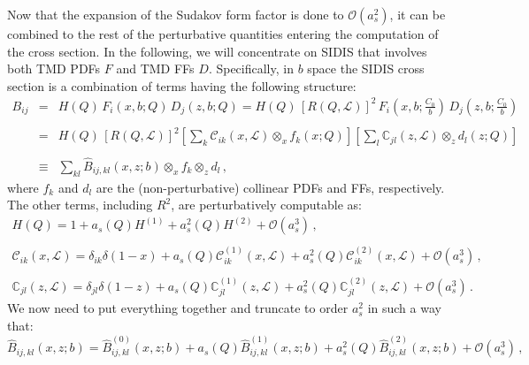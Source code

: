 \documentclass[10pt,a4paper]{article}
\begin{document}
Now that the expansion of the Sudakov form factor is done to
$\mathcal{O}(a_s^2)$, it can be combined to the rest of the
perturbative quantities entering the computation of the cross
section. In the following, we will concentrate on SIDIS that involves
both TMD PDFs $F$ and TMD FFs $D$. Specifically, in $b$ space the
SIDIS cross section is a combination of terms having the following
structure:
\begin{equation}
\begin{array}{rcl}
  \displaystyle B_{ij} &=& \displaystyle
                           H(Q)\,F_i(x,b;Q)\,D_j(z,b;Q)
                           =H(Q)\,\left[R(Q,\mathcal{L})\right]^2
                           \,F_i\left(x,b;\frac{C_0}{b}\right)\,D_j\left(z,b;\frac{C_0}{b}\right)\\
\\
&=& \displaystyle H(Q)\,\left[R(Q,\mathcal{L})\right]^2
                           \left[\sum_{k}
    \mathcal{C}_{ik}(x,\mathcal{L}) \mathop{\otimes}_x
    f_k\left(x;Q\right)\right]\left[\sum_{l}
    \mathbb{C}_{jl}(z,\mathcal{L}) \mathop{\otimes}_z
    d_l\left(z;Q\right)\right]\\
\\
&\equiv& \displaystyle \sum_{kl}\hat{B}_{ij,kl}(x,z;b)\mathop{\otimes}_{x}f_k \mathop{\otimes}_{z}d_l \,,
\end{array}
\end{equation}
where $f_k$ and $d_l$ are the (non-perturbative) collinear PDFs and FFs,
respectively. The other terms, including $R^2$, are perturbatively
computable as:
\begin{equation}
\begin{array}{l}
\displaystyle H(Q) = 1+a_s(Q)H^{(1)}+a_s^2(Q)H^{(2)}+\mathcal{O}(a_s^3)\,,\\
\\
\displaystyle \mathcal{C}_{ik}(x,\mathcal{L}) = \delta_{ik}\delta(1-x)+a_s(Q)
  \mathcal{C}_{ik}^{(1)}(x,\mathcal{L}) +a_s^2(Q) \mathcal{C}_{ik}^{(2)}(x,\mathcal{L})
  +\mathcal{O}(a_s^3) \,,\\
\\
\displaystyle \mathbb{C}_{jl}(z,\mathcal{L}) = \delta_{jl}\delta(1-z)+a_s(Q) \mathbb{C}_{jl}^{(1)}(z,\mathcal{L}) +a_s^2(Q) \mathbb{C}_{jl}^{(2)}(z,\mathcal{L}) +\mathcal{O}(a_s^3) \,.
\end{array}
\end{equation}
We now need to put everything together and truncate to order $a_s^2$
in such a way that:
\begin{equation}
\hat{B}_{ij,kl}(x,z;b) = \hat{B}_{ij,kl}^{(0)}(x,z;b)+a_s(Q) \hat{B}_{ij,kl}^{(1)}(x,z;b)+a_s^2(Q) \hat{B}_{ij,kl}^{(2)}(x,z;b)+\mathcal{O}(a_s^3) \,,
\end{equation}
\end{document}
